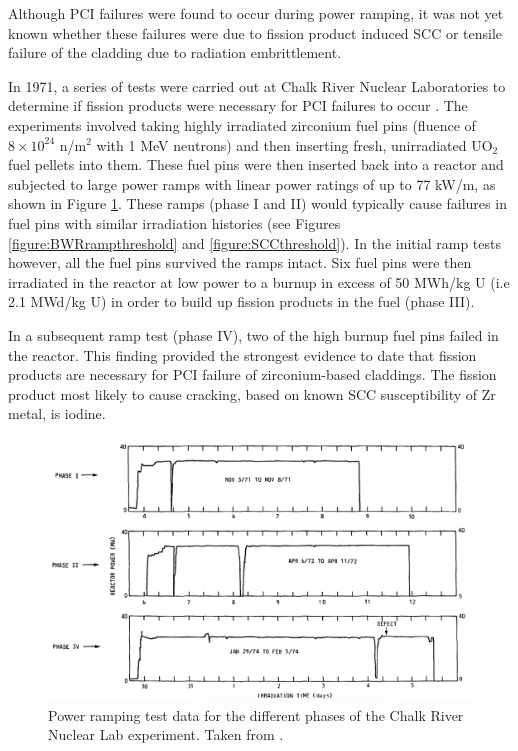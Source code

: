 Although PCI failures were found to occur during power ramping, it was not yet known whether these failures were due to fission product induced SCC or tensile failure of the cladding due to radiation embrittlement. 

In 1971, a series of tests were carried out at Chalk River Nuclear Laboratories to determine if fission products were necessary for PCI failures to occur \cite{MacDonald1979}. The experiments involved taking highly irradiated zirconium fuel pins (fluence of $8 \times 10^{24}$ n/m$^{2}$ with 1 MeV neutrons) and then inserting fresh, unirradiated UO$_{2}$ fuel pellets into them. These fuel pins were then inserted back into a reactor and subjected to large power ramps with linear power ratings of up to 77 kW/m, as shown in Figure \ref{figure:fueltests}. These ramps (phase I and II) would typically cause failures in fuel pins with similar irradiation histories (see Figures \ref{figure:BWRrampthreshold} and \ref{figure:SCCthreshold}). In the initial ramp tests however, all the fuel pins survived the ramps intact. Six fuel pins were then irradiated in the reactor at low power to a burnup in excess of 50 MWh/kg U (i.e 2.1 MWd/kg U) in order to build up fission products in the fuel (phase III). 

In a subsequent ramp test (phase IV), two of the high burnup fuel pins failed in the reactor. This finding provided the strongest evidence to date that fission products are necessary for PCI failure of zirconium-based claddings. The fission product most likely to cause cracking, based on known SCC susceptibility of Zr metal, is iodine.

\begin{landscape} %
\begin{figure}[ht]
\centering
\includegraphics[width=\linewidth]{images/fueltests.png}
\caption[Power ramping test data for the different phases of the Chalk River Nuclear Lab experiment.]{Power ramping test data for the different phases of the Chalk River Nuclear Lab experiment. Taken from \cite{MacDonald1979}.}
\label{figure:fueltests}
\end{figure}
\end{landscape}

